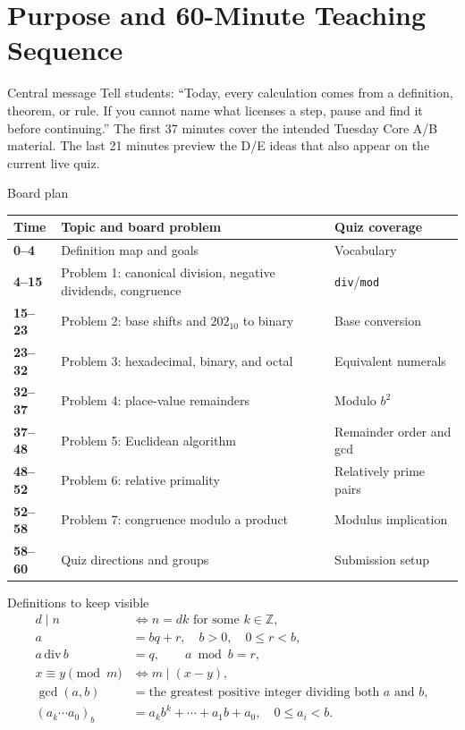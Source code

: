 \documentclass[10pt]{article}
\makeatletter
\let\ps@plain\ps@fancy
\let\ps@empty\ps@fancy
\newcommand{\Z}{\mathbb Z}
\makeatother
\begin{document}
\makeatletter
\let\ps@plain\ps@fancy
\let\ps@empty\ps@fancy
\makeatother
\pagestyle{fancy}

\section*{Purpose and 60-Minute Teaching Sequence}

\begin{goalbox}{Central message}
Tell students: ``Today, every calculation comes from a definition, theorem,
or rule. If you cannot name what licenses a step, pause and find it before
continuing.'' The first 37 minutes cover the intended Tuesday Core A/B
material. The last 21 minutes preview the D/E ideas that also appear on the
current live quiz.
\end{goalbox}

\begin{timingbox}{Board plan}
\begin{tabularx}{\linewidth}{@{}>{\bfseries}p{0.72in}X>{\raggedright\arraybackslash}p{1.45in}@{}}
\toprule
Time & Topic and board problem & Quiz coverage \\
\midrule
0--4 & Definition map and goals & Vocabulary \\
4--15 & Problem 1: canonical division, negative dividends, congruence & \texttt{div}/\texttt{mod} \\
15--23 & Problem 2: base shifts and $202_{10}$ to binary & Base conversion \\
23--32 & Problem 3: hexadecimal, binary, and octal & Equivalent numerals \\
32--37 & Problem 4: place-value remainders & Modulo $b^2$ \\
37--48 & Problem 5: Euclidean algorithm & Remainder order and gcd \\
48--52 & Problem 6: relative primality & Relatively prime pairs \\
52--58 & Problem 7: congruence modulo a product & Modulus implication \\
58--60 & Quiz directions and groups & Submission setup \\
\bottomrule
\end{tabularx}
\end{timingbox}

\begin{goalbox}{Definitions to keep visible}
\begin{align*}
d\mid n&\iff n=dk\text{ for some }k\in\Z,\\
a&=bq+r,\quad b>0,\quad0\le r<b,\\
a\,\mathrm{div}\,b&=q,\qquad a\bmod b=r,\\
x\equiv y\pmod m&\iff m\mid(x-y),\\
\gcd(a,b)&=\text{the greatest positive integer dividing both }a\text{ and }b,\\
(a_k\cdots a_0)_b&=a_kb^k+\cdots+a_1b+a_0,\quad0\le a_i<b.
\end{align*}
\end{goalbox}
\end{document}
